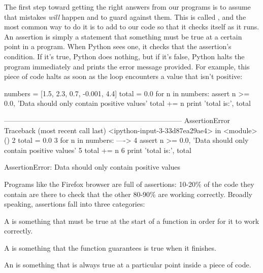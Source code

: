 The first step toward getting the right answers from our programs is to
assume that mistakes \emph{will} happen and to guard against them. This
is called , and
the most common way to do it is to add
 to our code so that it checks itself
as it runs. An assertion is simply a statement that something must be
true at a certain point in a program. When Python sees one, it checks
that the assertion's condition. If it's true, Python does nothing, but
if it's false, Python halts the program immediately and prints the error
message provided. For example, this piece of code halts as soon as the
loop encounters a value that isn't positive:

\begin{VerbIn}
numbers = [1.5, 2.3, 0.7, -0.001, 4.4]
total = 0.0
for n in numbers:
    assert n >= 0.0, 'Data should only contain positive values'
    total += n
print 'total is:', total
\end{VerbIn}

\begin{VerbErr}
---------------------------------------------------------------------------
AssertionError                            Traceback (most recent call last)
<ipython-input-3-33d87ea29ae4> in <module>()
      2 total = 0.0
      3 for n in numbers:
----> 4     assert n >= 0.0, 'Data should only contain positive values'
      5     total += n
      6 print 'total is:', total

AssertionError: Data should only contain positive values
\end{VerbErr}

Programs like the Firefox browser are full of assertions: 10-20\% of the
code they contain are there to check that the other 80-90\% are working
correctly. Broadly speaking, assertions fall into three categories:

\begin{swcitemize}
\item
  A  is something that must be
  true at the start of a function in order for it to work correctly.
\item
  A  is something that the
  function guarantees is true when it finishes.
\item
  An  is something that is always true
  at a particular point inside a piece of code.
\end{swcitemize}

